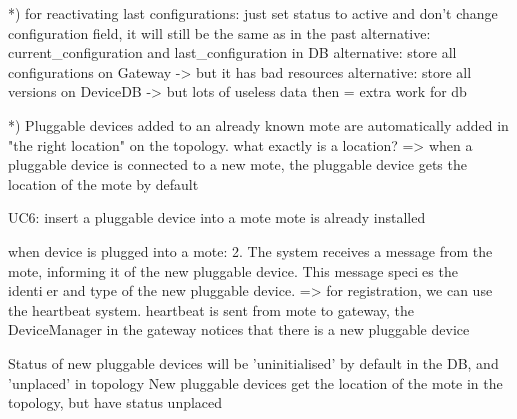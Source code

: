         *) for reactivating last configurations: just set status to active and don't change configuration field, it will still be the same as in the past
            alternative: current\_configuration and last\_configuration in DB
            alternative: store all configurations on Gateway -> but it has bad resources
            alternative: store all versions on DeviceDB -> but lots of useless data then = extra work for db

        *) Pluggable devices added to an already known mote are automatically added in "the right location" on the topology.
            what exactly is a location?
            => when a pluggable device is connected to a new mote, the pluggable device gets the location of the mote by default

        UC6: insert a pluggable device into a mote
            mote is already installed

            when device is plugged into a mote:
                2. The system receives a message from the mote, informing it of the new pluggable device. This
                message species the identier and type of the new pluggable device.
                => for registration, we can use the heartbeat system. heartbeat is sent from mote to gateway,
                the DeviceManager in the gateway notices that there is a new pluggable device

                Status of new pluggable devices will be 'uninitialised' by default in the DB, and 'unplaced' in topology
                New pluggable devices get the location of the mote in the topology, but have status unplaced




